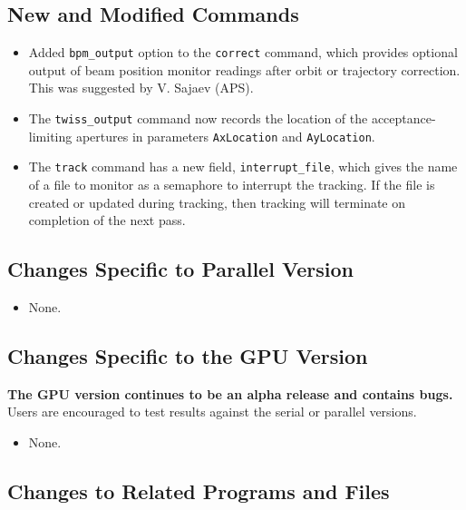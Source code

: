 \documentclass[11pt]{article}
\begin{document}
\subsection{New and Modified Commands}
\begin{itemize}
\item Added \verb|bpm_output| option to the \verb|correct| command, which provides optional output of beam position monitor
  readings after orbit or trajectory correction. This was suggested by V. Sajaev (APS).
\item The \verb|twiss_output| command now records the location of the acceptance-limiting apertures in parameters
  \verb|AxLocation| and \verb|AyLocation|.
\item The \verb|track| command has a new field, \verb|interrupt_file|, which gives the name of a file to monitor
  as a semaphore to interrupt the tracking. If the file is created or updated during tracking, then tracking will
  terminate on completion of the next pass.
\end{itemize}

\subsection{Changes Specific to Parallel Version}

\begin{itemize}
\item None.
\end{itemize}

\subsection{Changes Specific to the GPU Version}

{\bf The GPU version continues to be an alpha release and contains bugs.}
Users are encouraged to test results against the serial or parallel versions.

\begin{itemize}
\item None.
\end{itemize}

\subsection{Changes to Related Programs and Files}
\end{document}
